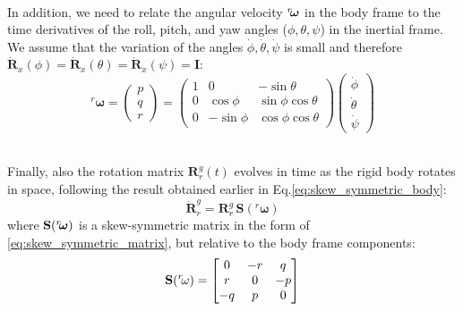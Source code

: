 \documentclass[main]{subfiles}
\begin{document}
\noindent\\
In addition, we need to relate the angular velocity \( {}^r\mkern-4mu\boldsymbol{\omega} \) in the body frame 
to the time derivatives of the roll, pitch, and yaw angles (\( \phi, \theta, \psi \)) 
in the inertial frame. We assume that the variation of the angles  $\dot{\phi}, \dot{\theta}, \dot{\psi}$
is small and therefore $\dot{\mathbf{R}}_x(\phi) = \dot{\mathbf{R}}_x(\theta) =  \dot{\mathbf{R}}_x(\psi) = \mathbf{I}$:
\begin{equation}
 {}^r\boldsymbol{\omega} = 
    \begin{pmatrix}
 p \\ q \\ r
    \end{pmatrix}
 =
    \begin{pmatrix}
        1 & 0 & -\sin\theta \\
        0 & \cos\phi & \sin\phi\cos\theta \\
        0 & -\sin\phi & \cos\phi\cos\theta
    \end{pmatrix}
    \begin{pmatrix}
 \dot{\phi} \\ \dot{\theta} \\ \dot{\psi}
    \end{pmatrix}
    \label{eq:angular_rates_to_rpy}
\end{equation}

\noindent\\
Finally, also the rotation matrix \( \mathbf{R}_r^g (t) \) 
evolves in time as the rigid body rotates in space, following the result obtained earlier
in Eq.\ref{eq:skew_symmetric_body}:
\begin{equation}
 \dot{\mathbf{R}}_r^g = \mathbf{R}_r^g \, \mathbf{S}({}^r\boldsymbol{\omega})
    \label{eq:rotation_matrix_dynamics_final}
\end{equation}
where \( \mathbf{S}({}^r\mkern-4mu\boldsymbol{\omega}) \) is a skew-symmetric matrix
in the form of \ref{eq:skew_symmetric_matrix}, but relative to the body frame components:
\begin{equation}
 \mathbf{S}({}^r\mkern-3mu\mathbf\boldsymbol{\omega}) = 
    \begin{bmatrix}
        0 & -r & q \\
        r & 0 & -p \\
        -q & p & 0
    \end{bmatrix}
\label{eq:skew_symmetric_matrix_body}
\end{equation}
\end{document}
